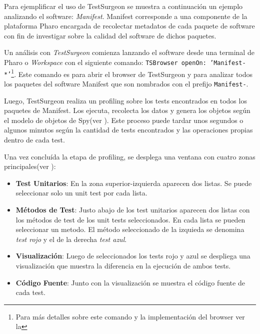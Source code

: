 \par Para ejemplificar el uso de TestSurgeon se muestra a continuación un ejemplo analizando el software: \emph{Manifest}. Manifest corresponde a una componente de la plataforma Pharo encargada de recolectar metadatos de cada paquete de software con fin de investigar sobre la calidad del software de dichos paquetes.

\par Un análisis con \emph{TestSurgeon} comienza lanzando el software desde una terminal de Pharo o \emph{Workspace} con el siguiente comando: {\tt TSBrowser openOn: 'Manifest-*'}\footnote{Para más detalles sobre este comando y la implementación del browser ver la  }. Este comando es para abrir el browser de TestSurgeon y para analizar todos los paquetes del software Manifest que son nombrados con el prefijo {\tt Manifest-}.


\par Luego, TestSurgeon realiza un profiling sobre los tests encontrados en todos los paquetes de Manifest. Los ejecuta, recolecta los datos y genera los objetos según el modelo de objetos de Spy(ver ). Este proceso puede tardar unos segundos o algunos minutos según la cantidad de tests encontrados y las operaciones propias dentro de cada test.

\par Una vez concluída la etapa de profiling, se desplega una ventana con cuatro zonas principales(ver ): 
\begin{itemize}
\item {\bf Test Unitarios}: En la zona superior-izquierda aparecen dos listas. Se puede seleccionar solo un unit test por cada lista.
\item {\bf Métodos de Test}: Justo abajo de los test unitarios aparecen dos listas con los métodos de test de los unit tests seleccionados. En cada lista se pueden seleccionar un metodo. El método seleccionado de la izquieda se denomina \emph{test rojo} y el de la derecha \emph{test azul}.
\item {\bf Visualización}: Luego de seleccionados los tests rojo y azul se despliega una visualización que muestra la diferencia en la ejecución de ambos tests.
\item {\bf Código Fuente}: Junto con la visualización se muestra el código fuente de cada test.
\end{itemize}

